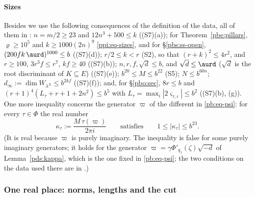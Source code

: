 \documentclass[10pt]{amsart}
\theoremstyle{definition}
\theoremstyle{remark}
\providecommand{\auPl}{\Phi}
\begin{document}
\paragraph*{Sizes}
Besides {\cite[(36) and~(38)]{P46}} we use the following consequences of the
definition of the data, all of them in {\cite[Lemma~13.4(S7)]{P46}}: $n=m/2\ge23$ and $12n^3+500\le k$
((S7)(a)); for Theorem~\ref{pbe:pillars}, $\varrho\ge10^5$ and $k\ge1000(2n)^9$ \eqref{ppi:eq-sizes}, and
for \S\ref{pbs:ss-open}, $(200fk\,\aurd)^{1000}\le b$ ((S7)(d)); $r/2\le k<r$ (S2), so that $(r+k)^2\le
4r^2$, and $r\ge100$, $3r^3f\le r^7$, $kf\ge40$ ((S7)(b)); $n,r,f,\sqrt d\le b$, and $\sqrt d\le\aurd$
($\sqrt d$ is the root discriminant of $K\subseteq E$) ((S7)(e)); $b^{20}\le M\le b^{22}$ (S5);
$N\le b^{60n}$; $d_\infty:=\dim W_{\lambda^X}\le b^{2kf}$ ((S7)(f)); and, for \S\ref{pbo:sec},
$8r\le b$ and $(r+1)^4(L_\tau+r+1+2n^2)\le b^5$ with $L_\tau=\max_i|2\varsigma_{\tau,i}|\le b^2$
((S7)(b), (g)). One more inequality concerns the generator $\varpi$ of the
different in \eqref{pb:eq-psi}: for every $\tau\in\auPl$ the real number
\begin{equation}\label{pbe:eq-kappa}
\kappa_\tau:=\frac{M\,\tau(\varpi)}{2\pi i}\qquad\text{satisfies}\qquad1\le|\kappa_\tau|\le b^{23}.
\end{equation}
(It is real because $\varpi$ is purely imaginary. The inequality is false for some purely imaginary generators; it holds for the generator $\varpi=\gamma\Phi'_{q_1}(\zeta)\sqrt{-d}$ of Lemma~\ref{pds:kappa}, which is the one fixed in \eqref{pb:eq-psi}; the two conditions on the data used there are in {\cite[Lemma~13.4(S7)]{P46}}.)

\subsubsection{One real place: norms, lengths and the cut}\label{pbe:ss-real}
\end{document}
